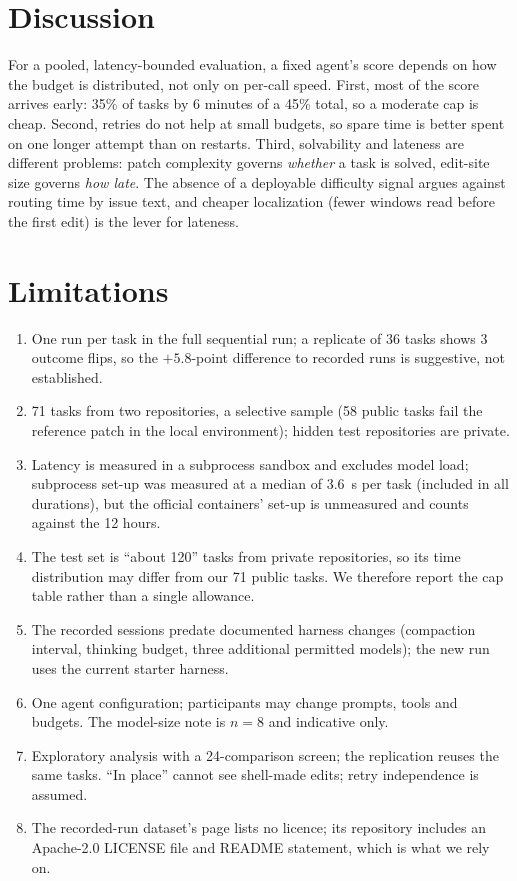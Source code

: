 \documentclass[conference]{IEEEtran}
\begin{document}
\section{Discussion}
For a pooled, latency-bounded evaluation, a fixed agent's score depends on how the budget is distributed, not only on per-call speed. First, most of the score arrives early: 35\% of tasks by 6 minutes of a 45\% total, so a moderate cap is cheap. Second, retries do not help at small budgets, so spare time is better spent on one longer attempt than on restarts. Third, solvability and lateness are different problems: patch complexity governs \emph{whether} a task is solved, edit-site size governs \emph{how late}. The absence of a deployable difficulty signal argues against routing time by issue text, and cheaper localization (fewer windows read before the first edit) is the lever for lateness.

\section{Limitations}
\begin{enumerate}
\item One run per task in the full sequential run; a replicate of 36 tasks shows 3 outcome flips, so the $+5.8$-point difference to recorded runs is suggestive, not established.
\item 71 tasks from two repositories, a selective sample (58 public tasks fail the reference patch in the local environment); hidden test repositories are private.
\item Latency is measured in a subprocess sandbox and excludes model load; subprocess set-up was measured at a median of 3.6~s per task (included in all durations), but the official containers' set-up is unmeasured and counts against the 12 hours.
\item The test set is ``about 120'' tasks from private repositories, so its time distribution may differ from our 71 public tasks. We therefore report the cap table rather than a single allowance.
\item The recorded sessions predate documented harness changes (compaction interval, thinking budget, three additional permitted models); the new run uses the current starter harness.
\item One agent configuration; participants may change prompts, tools and budgets. The model-size note is $n=8$ and indicative only.
\item Exploratory analysis with a 24-comparison screen; the replication reuses the same tasks. ``In place'' cannot see shell-made edits; retry independence is assumed.
\item The recorded-run dataset's page lists no licence; its repository includes an Apache-2.0 LICENSE file and README statement, which is what we rely on.
\end{enumerate}
\end{document}

